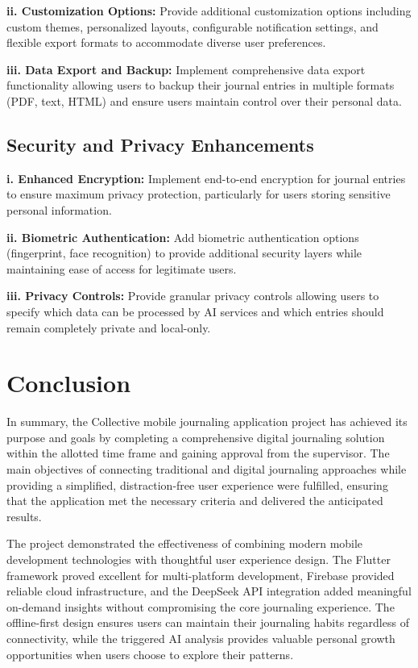 \textbf{ii. Customization Options:} Provide additional customization options including custom themes, personalized layouts, configurable notification settings, and flexible export formats to accommodate diverse user preferences.

\textbf{iii. Data Export and Backup:} Implement comprehensive data export functionality allowing users to backup their journal entries in multiple formats (PDF, text, HTML) and ensure users maintain control over their personal data.

\subsection{Security and Privacy Enhancements}

\textbf{i. Enhanced Encryption:} Implement end-to-end encryption for journal entries to ensure maximum privacy protection, particularly for users storing sensitive personal information.

\textbf{ii. Biometric Authentication:} Add biometric authentication options (fingerprint, face recognition) to provide additional security layers while maintaining ease of access for legitimate users.

\textbf{iii. Privacy Controls:} Provide granular privacy controls allowing users to specify which data can be processed by AI services and which entries should remain completely private and local-only.

\section{Conclusion}\label{sec:conclusion}

In summary, the Collective mobile journaling application project has achieved its purpose and goals by completing a comprehensive digital journaling solution within the allotted time frame and gaining approval from the supervisor. The main objectives of connecting traditional and digital journaling approaches while providing a simplified, distraction-free user experience were fulfilled, ensuring that the application met the necessary criteria and delivered the anticipated results.

The project demonstrated the effectiveness of combining modern mobile development technologies with thoughtful user experience design. The Flutter framework proved excellent for multi-platform development, Firebase provided reliable cloud infrastructure, and the DeepSeek API integration added meaningful on-demand insights without compromising the core journaling experience. The offline-first design ensures users can maintain their journaling habits regardless of connectivity, while the triggered AI analysis provides valuable personal growth opportunities when users choose to explore their patterns.

